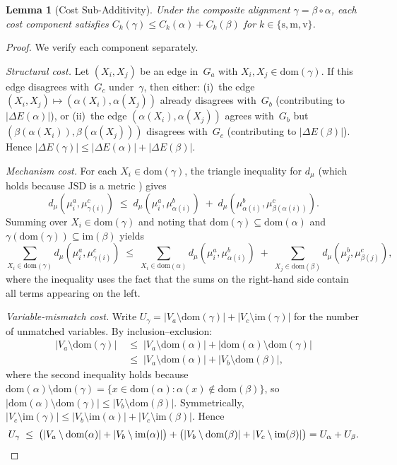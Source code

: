 \documentclass[11pt,a4paper]{article}
\newtheorem{lemma}[theorem]{Lemma}
\theoremstyle{definition}
\newcommand{\Dom}{\mathrm{dom}}               %
\newcommand{\Img}{\mathrm{im}}                %
\newcommand{\JSD}{\mathrm{JSD}}               %
\newcommand{\dmu}{d_{\mu}}                    %
\begin{document}
\begin{lemma}[Cost Sub-Additivity]\label{lem:subadditivity}
Under the composite alignment $\gamma = \beta \circ \alpha$, each cost
component satisfies
$C_k(\gamma) \le C_k(\alpha) + C_k(\beta)$ for $k \in \{\mathrm{s},
\mathrm{m}, \mathrm{v}\}$.
\end{lemma}

\begin{proof}
We verify each component separately.

\emph{Structural cost.}
Let $(X_i, X_j)$ be an edge in~$G_a$ with
$X_i, X_j \in \Dom(\gamma)$.  If this edge disagrees with~$G_c$
under~$\gamma$, then either:
(i)~the edge $(X_i, X_j) \mapsto (\alpha(X_i), \alpha(X_j))$ already
disagrees with~$G_b$ (contributing to $|\Delta E(\alpha)|$), or
(ii)~the edge $(\alpha(X_i), \alpha(X_j))$ agrees with~$G_b$ but
$(\beta(\alpha(X_i)), \beta(\alpha(X_j)))$ disagrees with~$G_c$
(contributing to $|\Delta E(\beta)|$).
Hence $|\Delta E(\gamma)| \le |\Delta E(\alpha)| + |\Delta E(\beta)|$.

\emph{Mechanism cost.}
For each $X_i \in \Dom(\gamma)$, the triangle inequality for $\dmu$
(which holds because $\JSD$ is a metric \citep{endres2003new}) gives
\[
  \dmu(\mu_i^a, \mu_{\gamma(i)}^c)
  \;\le\;
  \dmu(\mu_i^a, \mu_{\alpha(i)}^b)
  \;+\;
  \dmu(\mu_{\alpha(i)}^b, \mu_{\beta(\alpha(i))}^c).
\]
Summing over $X_i \in \Dom(\gamma)$ and noting that
$\Dom(\gamma) \subseteq \Dom(\alpha)$ and
$\gamma(\Dom(\gamma)) \subseteq \Img(\beta)$ yields
\[
  \sum_{X_i \in \Dom(\gamma)} \dmu(\mu_i^a, \mu_{\gamma(i)}^c)
  \;\le\;
  \sum_{X_i \in \Dom(\alpha)} \dmu(\mu_i^a, \mu_{\alpha(i)}^b)
  \;+\;
  \sum_{X_j \in \Dom(\beta)} \dmu(\mu_j^b, \mu_{\beta(j)}^c),
\]
where the inequality uses the fact that the sums on the right-hand side
contain all terms appearing on the left.

\emph{Variable-mismatch cost.}
Write $U_\gamma = |V_a \setminus \Dom(\gamma)| +
|V_c \setminus \Img(\gamma)|$ for the number of unmatched variables.
By inclusion--exclusion:
\begin{align*}
  |V_a \setminus \Dom(\gamma)|
  &\;\le\;
  |V_a \setminus \Dom(\alpha)|
  + |\Dom(\alpha) \setminus \Dom(\gamma)| \\
  &\;\le\;
  |V_a \setminus \Dom(\alpha)|
  + |V_b \setminus \Dom(\beta)|,
\end{align*}
where the second inequality holds because
$\Dom(\alpha) \setminus \Dom(\gamma) =
\{x \in \Dom(\alpha) : \alpha(x) \notin \Dom(\beta)\}$,
so $|\Dom(\alpha) \setminus \Dom(\gamma)| \le |V_b \setminus \Dom(\beta)|$.
Symmetrically,
$|V_c \setminus \Img(\gamma)| \le
|V_b \setminus \Img(\alpha)| + |V_c \setminus \Img(\beta)|$.
Hence
\[
  U_\gamma
  \;\le\;
  \bigl(|V_a \setminus \Dom(\alpha)| + |V_b \setminus \Img(\alpha)|\bigr)
  +
  \bigl(|V_b \setminus \Dom(\beta)| + |V_c \setminus \Img(\beta)|\bigr)
  = U_\alpha + U_\beta. \qedhere
\]
\end{proof}
\end{document}
